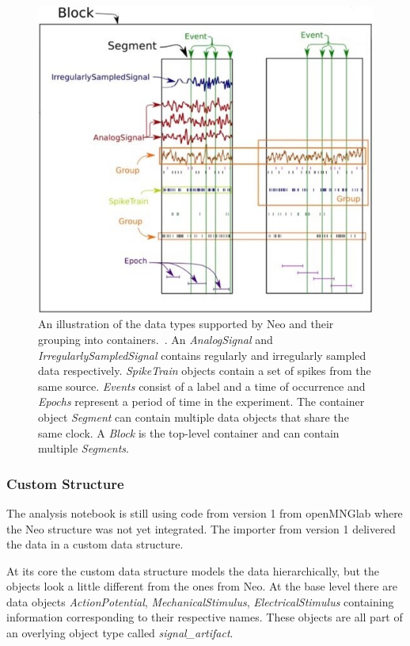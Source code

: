 \begin{figure}
	\includegraphics[width = \textwidth]{src/pic/neo_structure}
	\caption{An illustration of the data types supported by Neo and their grouping into containers.~\cite{neo14}. An \textit{AnalogSignal} and \textit{IrregularlySampledSignal} contains regularly and irregularly sampled data respectively. \textit{SpikeTrain} objects contain a set of spikes from the same source. \textit{Events} consist of a label and a time of occurrence and \textit{Epochs} represent a period of time in the experiment. The container object \textit{Segment} can contain multiple data objects that share the same clock. A \textit{Block} is the top-level container and can contain multiple \textit{Segments}.}
	\label{fig:neostructure}
\end{figure}

\subsubsection{Custom Structure}
The analysis notebook is still using code from version 1 from openMNGlab where the Neo structure was not yet integrated. The importer from version 1 delivered the data in a custom data structure.

At its core the custom data structure models the data hierarchically, but the objects look a little different from the ones from Neo. At the base level there are data objects \textit{ActionPotential}, \textit{MechanicalStimulus}, \textit{ElectricalStimulus} containing information corresponding to their respective names. These objects are all part of an overlying object type called \textit{signal\_artifact}.

